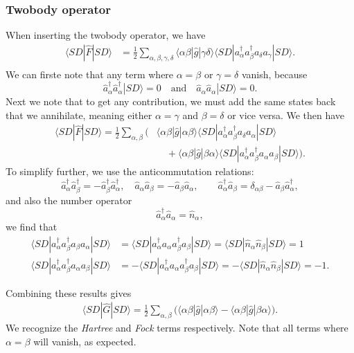 \documentclass[a4paper, 11pt, notitlepage, english]{article}
\newcommand{\ket}[1]{|#1 \rangle}
\newcommand{\op}[1]{\hat{#1}}
\newcommand{\braopket}[3]{\langle #1 | {#2} | #3 \rangle}
\begin{document}
\subsubsection*{Twobody operator}
When inserting the twobody operator, we have
\begin{align*}
\braopket{SD}{\op{F}}{SD}
&= \frac{1}{2}\sum_{\alpha, \beta, \gamma, \delta} \braopket{\alpha\beta}{\op{g}}{\gamma\delta}\braopket{SD}{a_\alpha^\dag a_\beta^\dag a_\delta  a_\gamma}{SD}.\\
\end{align*}
We can firste note that any term where $\alpha=\beta$ or $\gamma=\delta$ vanish, because
$$\op{a}_\alpha^\dag \op{a}_\alpha^\dag \ket{SD} = 0 \quad \mbox{and} \quad \op{a}_\alpha \op{a}_\alpha \ket{SD} = 0.$$
Next we note that to get any contribution, we must add the same states back that we annihilate, meaning either $\alpha = \gamma$ and $\beta = \delta$ or vice versa. We then have
\begin{align*}
\braopket{SD}{\op{F}}{SD}
= \frac{1}{2}\sum_{\alpha, \beta}\bigg(
&\braopket{\alpha\beta}{\op{g}}{\alpha\beta}\braopket{SD}{a_\alpha^\dag a_\beta^\dag a_\delta  a_\alpha}{SD} \\[-0.33cm]
&\quad+ \braopket{\alpha\beta}{\op{g}}{\beta\alpha}\braopket{SD}{a_\alpha^\dag a_\beta^\dag a_\alpha  a_\beta}{SD}\bigg).
\end{align*}
To simplify further, we use the anticommutation relations:
$$\op{a}_\alpha^\dag \op{a}_\beta^\dag = -\op{a}_\beta^\dag \op{a}_\alpha^\dag, \quad \op{a}_\alpha \op{a}_\beta = -\op{a}_\beta \op{a}_\alpha, \qquad \op{a}_\alpha^\dag \op{a}_\beta = \delta_{\alpha\beta} - \op{a}_\beta \op{a}_\alpha^\dag,$$
and also the number operator
$$\op{a}_\alpha^\dag \op{a}_\alpha = \op{n}_\alpha,$$
we find that
\begin{align*}
\braopket{SD}{a_\alpha^\dag a_\beta^\dag a_\beta a_\alpha}{SD} &= \braopket{SD}{a_\alpha^\dag a_\alpha a_\beta^\dag a_\beta}{SD} = \braopket{SD}{\op{n}_\alpha \op{n}_\beta}{SD} = 1\\
\braopket{SD}{a_\alpha^\dag a_\beta^\dag a_\alpha  a_\beta}{SD} &= -\braopket{SD}{a_\alpha^\dag  a_\alpha  a_\beta^\dag a_\beta}{SD} = -\braopket{SD}{\op{n}_\alpha \op{n}_\beta}{SD} = -1.
\end{align*}

Combining these results gives
\begin{align*}
\braopket{SD}{\op{G}}{SD}
=  \frac{1}{2}\sum_{\alpha,\beta} \bigg(\braopket{\alpha\beta}{\op{g}}{\alpha\beta} - \braopket{\alpha\beta}{\op{g}}{\beta\alpha}\bigg).
\end{align*}
We recognize the \emph{Hartree} and \emph{Fock} terms respectively. Note that all terms where $\alpha=\beta$ will vanish, as expected.
\end{document}

